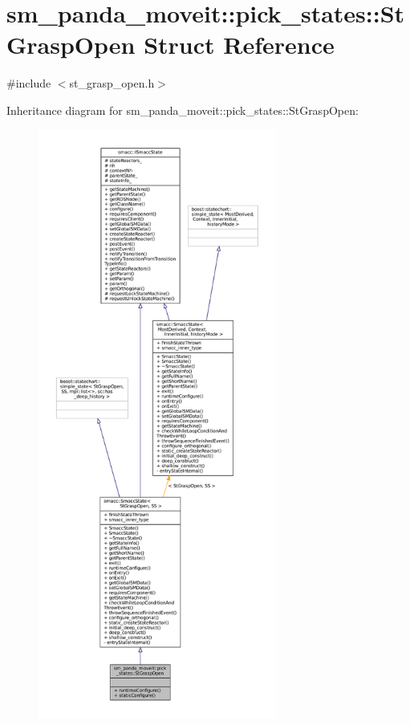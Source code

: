 \hypertarget{structsm__panda__moveit_1_1pick__states_1_1StGraspOpen}{}\section{sm\+\_\+panda\+\_\+moveit\+:\+:pick\+\_\+states\+:\+:St\+Grasp\+Open Struct Reference}
\label{structsm__panda__moveit_1_1pick__states_1_1StGraspOpen}


{\ttfamily \#include $<$st\+\_\+grasp\+\_\+open.\+h$>$}



Inheritance diagram for sm\+\_\+panda\+\_\+moveit\+:\+:pick\+\_\+states\+:\+:St\+Grasp\+Open\+:
\nopagebreak
\begin{figure}[H]
\begin{center}
\leavevmode
\includegraphics[height=550pt]{structsm__panda__moveit_1_1pick__states_1_1StGraspOpen__inherit__graph}
\end{center}
\end{figure}


